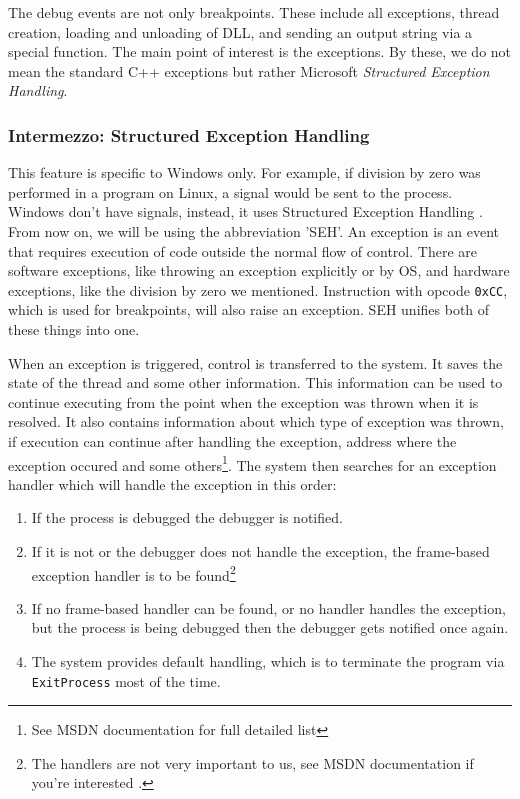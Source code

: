 The debug events are not only breakpoints. These include all exceptions, thread creation, loading and
unloading of DLL, and sending an output string via a special function. The main point of interest is the exceptions.
By these, we do not mean the standard C++ exceptions but rather Microsoft \textit{Structured Exception Handling}.

\subsubsection*{Intermezzo: Structured Exception Handling}
This feature is specific to Windows only. For example, if division by zero was performed in a program on Linux,
a signal would be sent to the process. Windows don't have signals, instead, it uses Structured Exception Handling \cite{windows-msdn-seh}. 
From now on, we will be using the abbreviation 'SEH'.
An exception is an event that requires execution of code outside the normal flow of control. There are software exceptions,
like throwing an exception explicitly or by OS, and hardware exceptions, like the division by zero we mentioned.
Instruction with opcode \lstinline{0xCC}, which is used for breakpoints, will also raise an exception. SEH unifies both of these things into one.

When an exception is triggered, control is transferred to the system. It saves the state of the thread and some other information.
This information can be used to continue executing from the point when the exception was thrown when it is resolved. It also
contains information about which type of exception was thrown, if execution can continue after handling the exception, address where the
exception occured and some others\footnote{See MSDN documentation \cite{windows-msdn-seh} for full detailed list}.
The system then searches for an exception handler which will handle the exception in this order:

\begin{enumerate}
    \item If the process is debugged the debugger is notified.
    \item If it is not or the debugger does not handle the exception, the frame-based exception handler is to be found\footnote{The handlers are not very important to us, see MSDN documentation if you're interested \cite{windows-msdn-seh}.}
    \item If no frame-based handler can be found, or no handler handles the exception, but the process is being debugged then the debugger gets notified once again.
    \item The system provides default handling, which is to terminate the program via \lstinline{ExitProcess} most of the time.
\end{enumerate}

